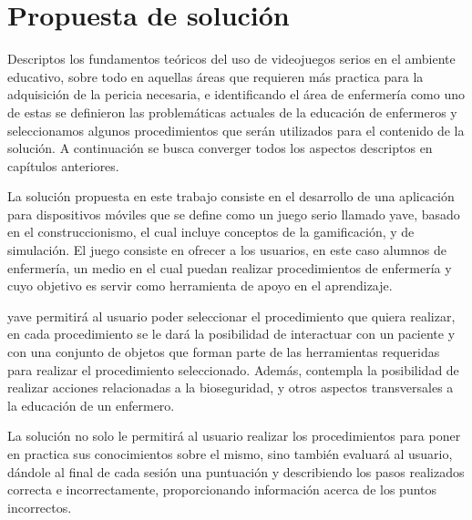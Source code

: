 \chapter{Propuesta de solución}
\label{chap:solucion}


Descriptos los fundamentos teóricos del uso de videojuegos serios en el ambiente
educativo, sobre todo en aquellas áreas que requieren más practica para la
adquisición de la pericia necesaria, e identificando el área de enfermería como
uno de estas se definieron las problemáticas actuales de la educación de
enfermeros y seleccionamos algunos procedimientos que serán utilizados para el
contenido de la solución. A continuación se busca converger todos los aspectos
descriptos en capítulos anteriores.

La solución propuesta en este trabajo consiste en el desarrollo de una
aplicación para dispositivos móviles que se define como un juego serio llamado
\Gls{yave}, basado en el construccionismo, el cual incluye conceptos de la
gamificación, y de simulación. El juego consiste en ofrecer a los usuarios, en
este caso alumnos de enfermería, un medio en el cual puedan realizar
procedimientos de enfermería y cuyo objetivo es servir como herramienta de apoyo
en el aprendizaje.

\Gls{yave} permitirá al usuario poder seleccionar el procedimiento que quiera
realizar, en cada procedimiento se le dará la posibilidad de interactuar con un
paciente y con una conjunto de objetos que forman parte de las herramientas
requeridas para realizar el procedimiento seleccionado. Además, contempla la
posibilidad de realizar acciones relacionadas a la bioseguridad, y otros 
aspectos transversales a la educación de un enfermero.

La solución no solo le permitirá al usuario realizar los procedimientos para
poner en practica sus conocimientos sobre el mismo, sino también evaluará al
usuario, dándole al final de cada sesión una puntuación y describiendo los
pasos realizados correcta e incorrectamente, proporcionando información acerca
de los puntos incorrectos.


%





%



